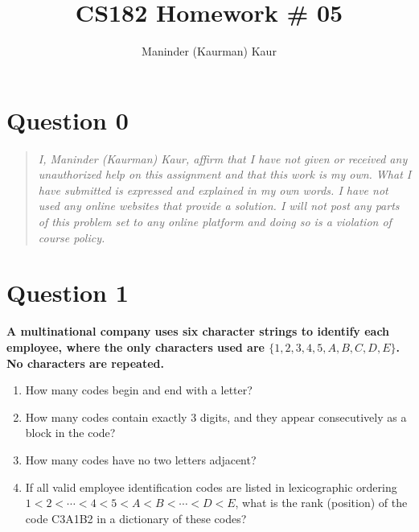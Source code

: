 \documentclass[11pt]{article}
\title{CS182 Homework \# 05}
\author{Maninder (Kaurman) Kaur}
\begin{document}
\maketitle

\section*{Question 0}
\begin{quote}
    \textit{I, Maninder (Kaurman) Kaur, affirm that I have not given or received any unauthorized help on this assignment and that this work is my own. What I have submitted is expressed and explained in my own words. I have not used any online websites that provide a solution. I will not post any parts of this problem set to any online platform and doing so is a violation of course policy.}
\end{quote}

\clearpage
\section*{Question 1}

    \textbf{A multinational company uses six character strings to identify each employee, where the only characters used are $\{1,2,3,4,5,A,B,C,D,E\}$. No characters are repeated.}
    \begin{enumerate}[label=(\alph*)]
        \item How many codes begin and end with a letter?
        \item How many codes contain exactly 3 digits, and they appear consecutively as a block in the code?
        \item How many codes have no two letters adjacent?
        \item If all valid employee identification codes are listed in lexicographic ordering $1 < 2 < \cdots < 4 < 5 < A < B < \cdots < D < E$, what is the rank (position) of the code C3A1B2 in a dictionary of these codes?
    \end{enumerate}
\end{document}
